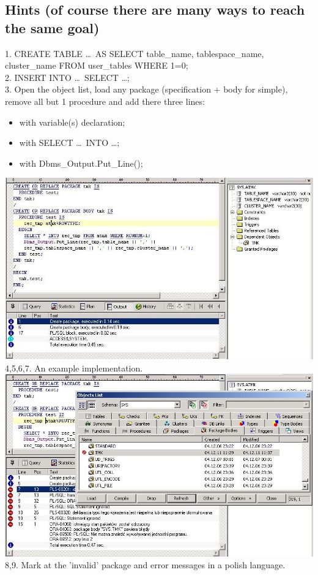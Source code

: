 \documentclass[a4paper,titlepage]{article}
\begin{document}
\subsection{Hints (of course there are many ways to reach the same goal)}
1. CREATE TABLE \dots\ AS SELECT table\_name, tablespace\_name, cluster\_name FROM user\_tables WHERE 1=0;\\[.3cm]
2. INSERT INTO \dots\ SELECT \dots;\\[.3cm]
3. Open the object list, load any package (specification + body for simple), remove all but 1 procedure and add there three lines:
\begin{itemize}
\item with variable(s) declaration;
\item with SELECT \dots\ INTO \dots;
\item with Dbms\_Output.Put\_Line();
\end{itemize}
\includegraphics[bb=0 0 803 471,width=\textwidth]{04exercise00}
4,5,6,7. An example implementation.\\
\includegraphics[bb=0 0 803 473,width=\textwidth]{04exercise01}
8,9. Mark at the 'invalid' package and error messages in a polish language.
\end{document}
